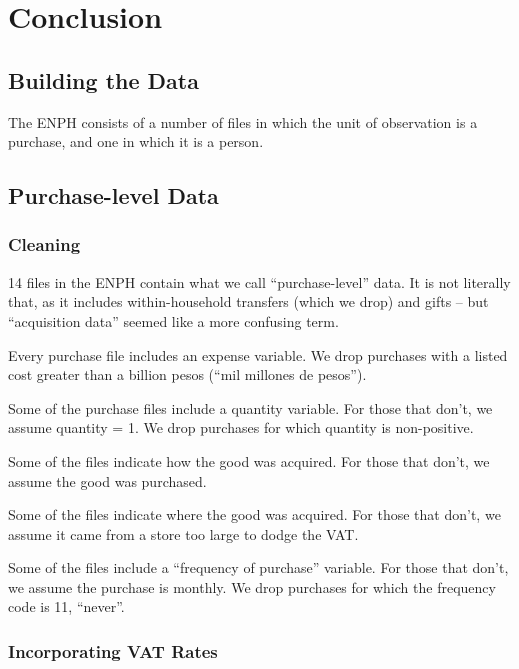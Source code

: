 \documentclass[12pt]{article}
\begin{document}
\section{Conclusion}



\citet{microsim}

\begin{appendices}
\section{Building the Data}
The ENPH consists of a number of files in which the unit of observation is a purchase, and one in which it is a person.

\subsection{Purchase-level Data}

\subsubsection{Cleaning}

14 files in the ENPH contain what we call ``purchase-level'' data.
It is not literally that, as it includes within-household transfers (which we drop) and gifts
-- but ``acquisition data'' seemed like a more confusing term.

Every purchase file includes an expense variable.
We drop purchases with a listed cost greater than a billion pesos
(``mil millones de pesos'').

Some of the purchase files include a quantity variable.
For those that don't, we assume quantity = 1.
We drop purchases for which quantity is non-positive.

Some of the files indicate how the good was acquired.
For those that don't, we assume the good was purchased.

Some of the files indicate where the good was acquired.
For those that don't, we assume it came from a store too large to dodge the VAT.

Some of the files include a ``frequency of purchase'' variable.
For those that don't, we assume the purchase is monthly.
We drop purchases for which the frequency code is 11, ``never''.

\subsubsection{Incorporating VAT Rates}


\end{appendices}
\end{document}
